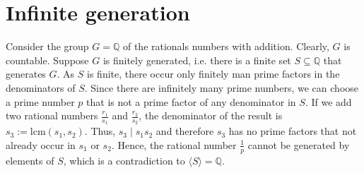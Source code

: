 \section{Infinite generation}
Consider the group $G = \mathds{Q}$ of the rationals numbers with addition. Clearly, $G$ is countable. Suppose $G$ is finitely generated, i.e. there is a finite set $S \subseteq \mathds{Q}$ that generates $G$. As $S$ is finite, there occur only finitely man prime factors in the denominators of $S$. Since there are infinitely many prime numbers, we can choose a prime number $p$ that is not a prime factor of any denominator in $S$. If we add two rational numbers $\frac{r_1}{s_1}$ and $\frac{r_2}{s_2}$, the denominator of the result is $s_3 := \text{lcm}(s_1,s_2)$. Thus, $s_3 \mid s_1 s_2$ and therefore $s_3$ has no prime factors that not already occur in $s_1$ or $s_2$. Hence, the rational number $\frac{1}{p}$ cannot be generated by elements of $S$, which is a contradiction to $\langle S \rangle = \mathds{Q}$.